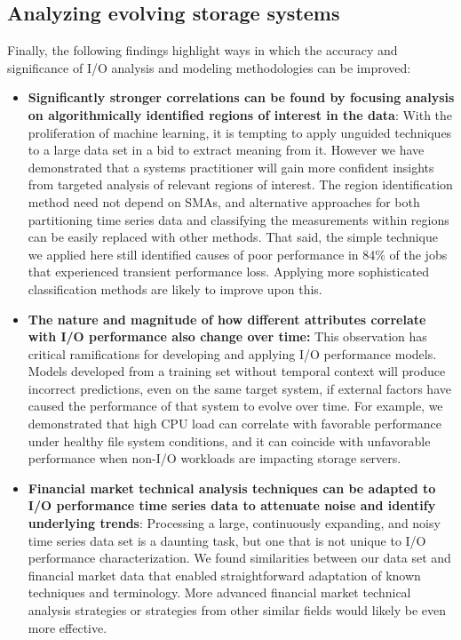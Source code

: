 \subsection{Analyzing evolving storage systems}

Finally, the following findings highlight ways in which the accuracy and significance of I/O analysis and modeling methodologies can be improved:

\begin{itemize}[leftmargin=*]

\item \textbf{Significantly stronger correlations can be found by focusing analysis on algorithmically identified regions of interest in the data}:
With the proliferation of machine learning, it is tempting to apply unguided techniques to a large data set in a bid to extract meaning from it.
However we have demonstrated that a systems practitioner will gain more confident insights from targeted analysis of relevant regions of interest.
The region identification method need not depend on SMAs, and alternative approaches for both partitioning time series data and classifying the measurements within regions can be easily replaced with other methods.
That said, the simple technique we applied here still identified causes of poor performance in 84\% of the jobs that experienced transient performance loss.
Applying more sophisticated classification methods are likely to improve upon this.


\item \textbf{The nature and magnitude of how different attributes correlate with I/O performance also change over time:}
This observation has critical ramifications for developing and applying I/O performance models.
Models developed from a training set without temporal context will produce incorrect predictions, even on the same target system, if
external factors have caused the performance of that system to evolve over time.
For example, we demonstrated that high CPU load can correlate with favorable performance under healthy file system conditions, and it can coincide with unfavorable performance when non-I/O workloads are impacting storage servers.

\item \textbf{Financial market technical analysis techniques can be adapted to I/O performance time series data to attenuate noise and identify underlying trends}:
Processing a large, continuously expanding, and noisy time series data set is a daunting task, but one that is not unique to I/O performance characterization.
We found similarities between our data set and financial market data that enabled straightforward adaptation of known techniques and terminology.
More advanced financial market technical analysis strategies or strategies from other similar fields would likely be even more effective.

\end{itemize}
